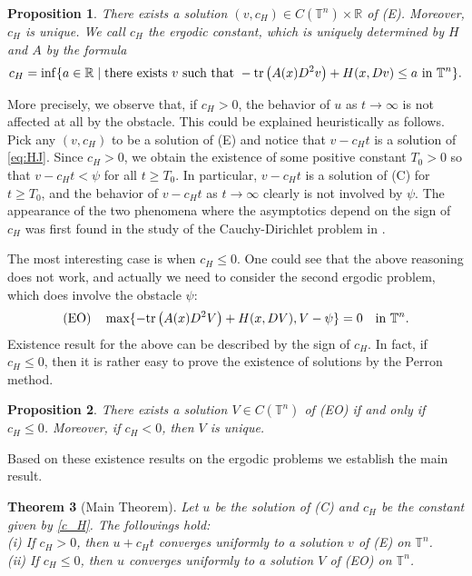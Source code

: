 \documentclass[12pt,reqno]{amsart}
\theoremstyle{plain}
\newtheorem{thm}{Theorem}[section]
\newtheorem{prop}[thm]{Proposition}
\theoremstyle{remark}
\numberwithin{equation}{section}
\begin{document}
\begin{prop}\label{prop:e.CGMT}
There exists  a solution $(v,c_H)\in C({\mathbb{T}}^n)\times{\mathbb{R}}$ of {\rm(E)}. 
Moreover, $c_H$ is unique. We call $c_H$ the ergodic constant, which is  uniquely determined by $H$ and $A$ by the formula
\begin{equation}\label{c_H}
c_H=\inf\{a\in\mathbb{R}\mid \text{there exists} \ v \ \text{such that} \  
-{{\rm tr}\,}\big(A(x)D^2v\big)+H(x,Dv)\le a \ \text{in} \ {\mathbb{T}}^n\}. 
\end{equation}
\end{prop}

More precisely, we observe that, if $c_H>0$, the behavior of $u$ as $t\to\infty$ 
is not affected at all by the obstacle. 
This could be explained heuristically as follows. Pick any $(v,c_H)$ to be a solution of (E) and notice that $v-c_H t$ is a solution of \eqref{eq:HJ}. 
Since $c_H>0$, we obtain the existence of some positive constant $T_0>0$ so that $v-c_H t <\psi$ for all $t \geq T_0$. In particular, $v-c_Ht$ is a solution of (C) for $t\geq T_0$, and the behavior of $v-c_Ht$ as $t\to \infty$ clearly is not involved by $\psi$.
The appearance of the two phenomena where the asymptotics depend on the sign of $c_H$ was first found in the study of the Cauchy-Dirichlet problem in \cite{M2,M3,Ta}. 

The most interesting case is when $c_H\leq 0$. One could see that
 the above reasoning does not work, and actually we need to consider the second ergodic problem, which does involve the obstacle $\psi$:
\begin{equation*}
{\rm (EO)}\quad
\max\{-{{\rm tr}\,}\big(A(x)D^2V\big)+H(x,DV), V-\psi\}=0 \quad \text{in} \ {\mathbb{T}}^n.
\end{equation*}
Existence result for the above can be described by the sign of $c_H$. In fact, 
if $c_H\le0$, then it is rather easy to prove the existence of solutions by 
the Perron method. 

\begin{prop}\label{prop:EO}
There exists a solution $V\in C({\mathbb{T}}^n)$ of {\rm (EO)} if and only if $c_H\le0$. Moreover, if $c_H<0$, then $V$ is unique.
\end{prop}

Based on these existence results on the ergodic problems we establish the main result. 
\begin{thm}[Main Theorem]\label{thm:main}
Let $u$ be the solution of {\rm(C)} and $c_H$ be the constant given by \eqref{c_H}. 
The followings hold:\\
{\rm(i)} 
If $c_H>0$, then 
$u+c_Ht$ converges uniformly to a solution $v$ of {\rm(E)} on ${\mathbb{T}}^n$.\\
{\rm(ii)} 
If $c_H\leq 0$, then $u$ converges uniformly to a solution $V$ of {\rm (EO)} on ${\mathbb{T}}^n$.
\end{thm}
\end{document}
